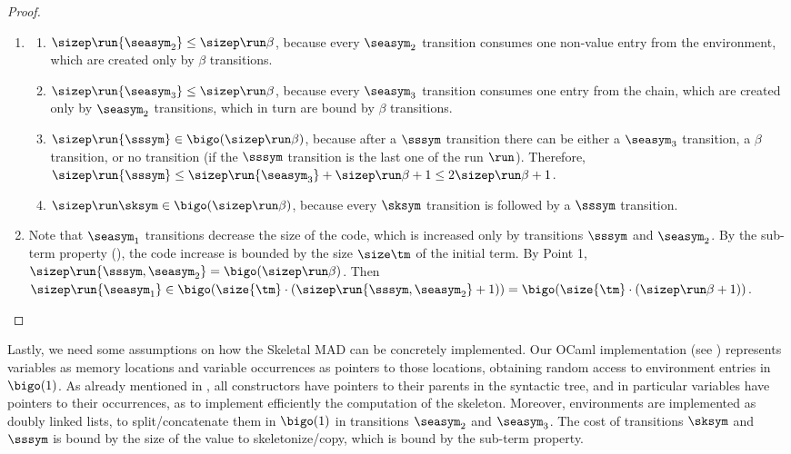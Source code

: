 \begin{proof}

\hfill
\begin{enumerate}
\item
\begin{enumerate}
\item $\sizep\run{\seasym_2} \leq \sizep\run\beta$, because every $\seasym_2$ transition consumes one non-value entry from the environment, which are created only by $\beta$ transitions.

\item $\sizep\run{\seasym_3} \le \sizep\run\beta$, because every $\seasym_3$ transition consumes one entry from the chain, which are created only by $\seasym_2$ transitions, which in turn are bound by $\beta$ transitions.

\item $\sizep\run{\sssym} \in \bigo(\sizep\run\beta)$, because
after a $\sssym$ transition there can be either a $\seasym_3$ transition, a $\beta$ transition, or no transition (if the $\sssym$ transition is the last one of the run $\run$). Therefore, $\sizep\run{\sssym} \leq \sizep\run{\seasym_3} + \sizep\run\beta +1 \leq 2\sizep\run\beta +1$.

\item $\sizep\run\sksym \in \bigo(\sizep\run\beta)$, because every $\sksym$ transition is followed by a $\sssym$ transition.
\end{enumerate}

\item Note that $\seasym_1$ transitions decrease the size of the code, which is increased only by transitions $\sssym$ and $\seasym_2$. By the sub-term property (), the code increase is bounded by the size $\size\tm$ of the initial term. By Point 1, $\sizep\run{\sssym,\seasym_2} =\bigo(\sizep\run\beta)$. Then $\sizep\run{\seasym_1} \in \bigo(\size{\tm}\cdot(\sizep\run{\sssym,\seasym_2} +1))=\bigo(\size{\tm}\cdot(\sizep\run\beta +1))$.\qedhere
\end{enumerate}
\end{proof}

Lastly, we need some assumptions on how the Skeletal MAD can be concretely implemented. Our OCaml implementation (see ) represents variables as memory locations and variable occurrences as pointers to those locations, obtaining random access to environment entries in $\bigo(1)$. As already mentioned in , all constructors have pointers to their parents in the syntactic tree, and in particular variables  have pointers to their occurrences, as to implement efficiently the computation of the skeleton. Moreover, environments are implemented as doubly linked lists, to split/concatenate them in $\bigo(1)$ in transitions $\seasym_2$ and $\seasym_3$. The cost of transitions $\sksym$ and $\sssym$ is bound by the size of the value to skeletonize/copy, which is bound by the sub-term property.


